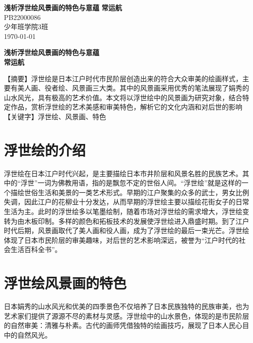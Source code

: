 \documentclass{ctexart}
\begin{document}
\begin{titlepage}
   \begin{center}
    \vspace*{1cm}
    \Huge
    \textbf{浅析浮世绘风景画的特色与意蕴}
    \vspace{0.3cm}
    \vfill
    \huge
    \textbf{常运航}\\
    \vspace{0.8cm}
    \vspace{1.5cm}
    \LARGE      
    PB22000086\\
    少年班学院3班\\
    \today\\
   \end{center}
\end{titlepage}
\pagestyle{empty}
\begin{center}
    \huge
    \textbf{浅析浮世绘风景画的特色与意蕴}
    \\
    \vspace{0.4cm}
    \LARGE
    \vspace{0.4cm}
    \textbf{常运航}
\end{center}
【摘要】浮世绘是日本江户时代市民阶层创造出来的符合大众审美的绘画样式，主要有美人画、役者绘、风景画三大类。其中的风景画采用优秀的笔法展现了娟秀的山水风光，具有极高的艺术价值。本文将以浮世绘中的风景画为研究对象，结合特定作品，赏析浮世绘的艺术美感和审美特色，解析它的文化内涵和对后世的影响
\\
【关键字】浮世绘、风景画、特色
\vspace{1.5cm}
\section{浮世绘的介绍}
浮世绘在日本江户时代兴起，是主要描绘日本市井阶层和风景名胜的民族艺术。其中的“浮世”一词为佛教用语，指的是飘忽不定的世俗人间。“浮世绘”就是这样的一个描绘世俗生活和美景的一类艺术形式。早期的江户聚集的众多的武士，男女比例失调，因此江户的花柳业十分发达，从而早期的浮世绘主要以描绘花街女子的日常生活为主。此时的浮世绘多以笔墨绘制，随着市场对浮世绘的需求增大，浮世绘变转为由木板印制。多样的颜色和拓板技术的发展使浮世绘进入鼎盛时期。到了江户时代后期，风景画取代了美人画和役人画，成为了浮世绘的最后一束光芒。\cite{对日本浮世绘之探析}浮世绘体现了日本市民阶层的审美趣味，对后世的艺术影响深远，被誉为“江户时代的社会生活百科全书”。
\section{浮世绘风景画的特色}
日本娟秀的山水风光和优美的四季景色不仅培养了日本民族独特的民族审美，也为艺术家们提供了源源不尽的素材与灵感。浮世绘中的山水景色，体现的是市民阶层的自然审美：清雅与朴素。古代的画师凭借独特的绘画技巧，展现了日本人民心目中的自然风光。\cite{浮世绘审美特征研究}
\end{document}
